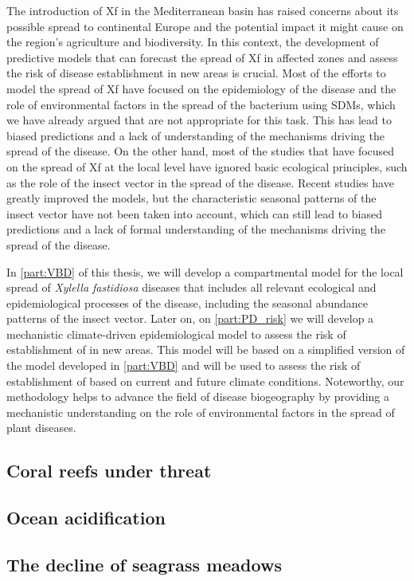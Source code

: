 The introduction of Xf in the Mediterranean basin has raised concerns about its
possible spread to continental Europe and the potential impact it might cause
on the region's agriculture and biodiversity. In this context, the development
of predictive models that can forecast the spread of Xf in affected zones and
assess the risk of disease establishment in new areas is crucial. Most of the
efforts to model the spread of Xf have focused on the epidemiology of the
disease and the role of environmental factors in the spread of the bacterium
using SDMs, which we have already argued that are not appropriate for this
task. This has lead to biased predictions and a lack of understanding of the
mechanisms driving the spread of the disease. On the other hand, most of the
studies that have focused on the spread of Xf at the local level have ignored
basic ecological principles, such as the role of the insect vector in the
spread of the disease. Recent studies have greatly improved the models, but the
characteristic seasonal patterns of the insect vector have not been taken into
account, which can still lead to biased predictions and a lack of formal
understanding of the mechanisms driving the spread of the disease.

In \cref{part:VBD} of this thesis, we will develop a compartmental model for
the local spread of \textit{Xylella fastidiosa} diseases that includes all
relevant ecological and epidemiological processes of the disease, including
the seasonal abundance patterns of the insect vector. Later on, on
\cref{part:PD_risk} we will develop a mechanistic climate-driven
epidemiological model to assess the risk of establishment of \xf{} in new
areas. This model will be based on a simplified version of the model developed
in \cref{part:VBD} and will be used to assess the risk of establishment of
\xf{} based on current and future climate conditions. Noteworthy, our
methodology helps to advance the field of disease biogeography by providing a
mechanistic understanding on the role of environmental factors in the spread of
plant diseases.

\subsection{\label{sec:Coral reefs under threat} Coral reefs under threat}

\subsection{\label{sec:Ocean acidification} Ocean acidification}

\subsection{\label{sec:The decline of seagrass meadows} The decline of seagrass
  meadows}